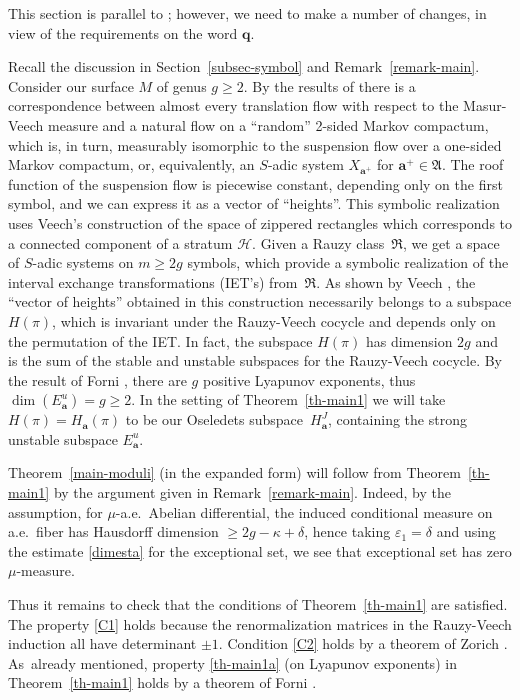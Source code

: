 \documentclass[JEP,XML,SOM,Unicode]{cedram}
\let\mathcal\mathscr
\let\epsilon\varepsilon
\theoremstyle{plain}
\theoremstyle{definition}
\newcommand\bom{{\boldsymbol a}}\let\ba\bom
\newcommand\bq{{\boldsymbol q}}
\newcommand\FrA{\mathfrak{A}}
\newcommand\FrR{\mathfrak{R}}
\newcommand\Hk{\mathcal{H}}
\begin{document}
This section is parallel to \cite[\S11]{BuSo18a}; however, we need to make a number of changes, in view of the requirements on the word $\bq$.

Recall the discussion in Section~\ref{subsec-symbol} and Remark~\ref{remark-main}.
Consider our surface $M$ of genus $g\ge 2$. By the results of \cite[\S4]{Buf-umn} there is a correspondence between almost every translation flow with respect to the Masur-Veech measure and a natural flow on a ``random'' 2-sided Markov compactum, which is, in turn, measurably isomorphic to the suspension flow over a one-sided Markov compactum, or, equivalently, an $S$-adic system $X_{\bom^+}$ for $\bom^+\in \FrA$. The roof function of the suspension flow is piecewise constant, depending only on the first symbol, and we can express it as a vector of ``heights''. This symbolic realization uses Veech's construction \cite{veech} of the space of zippered rectangles which corresponds to a connected component of a stratum $\Hk$. Given a Rauzy class~$\FrR$, we get a space of $S$-adic systems on $m\ge 2g$ symbols, which provide a symbolic realization of the interval exchange transformations (IET's) from~$\FrR$. As shown by Veech \cite{veechamj}, the ``vector of heights'' obtained in this construction necessarily belongs to a subspace $H(\pi)$, which is invariant under the Rauzy-Veech cocycle and depends only on the permutation of the IET. In fact, the subspace $H(\pi)$ has dimension $2g$ and is the sum of the stable and unstable subspaces for the Rauzy-Veech cocycle. By the result of Forni \cite{Forni}, there are $g$ positive Lyapunov exponents, thus $\dim(E^u_\bom)=g\ge 2$. In the setting of Theorem~\ref{th-main1} we will take $H(\pi) = H_\bom(\pi)$ to be our Oseledets subspace~$H^J_\bom$, containing the strong unstable subspace $E^u_\bom$.

Theorem~\ref{main-moduli} (in the expanded form) will follow from Theorem~\ref{th-main1} by the argument given in Remark~\ref{remark-main}. Indeed, by the assumption, for $\mu$-a.e.\ Abelian differential, the induced conditional measure on a.e.\ fiber has Hausdorff dimension $\ge 2g-\kappa + \delta$, hence taking $\epsilon_1=\delta$ and using the estimate \eqref{dimesta} for the exceptional set, we see that exceptional set has zero $\mu$-measure.

Thus it remains to check that the conditions of Theorem~\ref{th-main1} are satisfied. The property \eqref{C1} holds because the renormalization matrices in the Rauzy-Veech induction all have determinant $\pm 1$. Condition \eqref{C2} holds by a theorem of Zorich \cite{Zorich}. As~already mentioned, property \eqref{th-main1a} (on Lyapunov exponents) in Theorem~\ref{th-main1} holds by a theorem of Forni \cite{Forni}.
\end{document}
